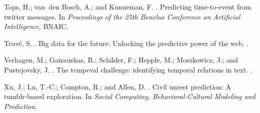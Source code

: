 \documentclass[letterpaper]{article}
\begin{document}
\begin{thebibliography}{}
Tops, H.; van~den Bosch, A.; and Kunneman, F.
.
\newblock Predicting time-to-event from twitter messages.
\newblock In {\em Proceedings of the 25th Benelux Conference on Artificial
  Intelligence}, BNAIC.

Truv{\'e}, S.
.
\newblock Big data for the future: Unlocking the predictive power of the web.
.

Verhagen, M.; Gaizauskas, R.; Schilder, F.; Hepple, M.; Moszkowicz, J.; and
  Pustejovsky, J.
.
\newblock The tempeval challenge: identifying temporal relations in text.
.

Xu, J.; Lu, T.-C.; Compton, R.; and Allen, D.
.
\newblock Civil unrest prediction: A tumblr-based exploration.
\newblock In {\em Social Computing, Behavioral-Cultural Modeling and
  Prediction}.

\end{thebibliography}
\end{document}

